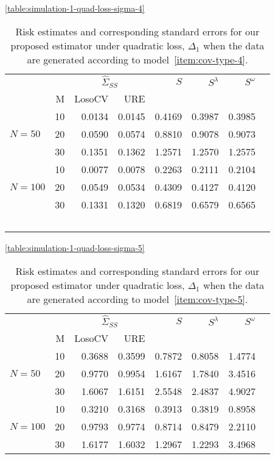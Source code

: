 \documentclass[12pt]{article}
\theoremstyle{definition}
\begin{document}

\begin{table}[H]\ref{table:simulation-1-quad-loss-sigma-4}
\centering
\caption{Risk estimates and corresponding standard errors for our proposed estimator under quadratic loss, $\Delta_1$ when the data are generated according to model~\ref{item:cov-type-4}.} 
\begin{tabular}{l|r|rrrrrr}
&  & \multicolumn{2}{c}{$\hat{\Sigma}_{SS}$} & $S$ & $S^\lambda$ & $S^\omega$ \\ 
&M & \mbox{LosoCV} & \mbox{URE} &  \\ 
  \hline
 &    10 & 0.0134 &  0.0145	& 0.4169 & 0.3987 & 0.3985 \\ 
$N = 50$ &    20 & 0.0590 & 0.0574 & 0.8810& 0.9078 & 0.9073 \\ 
 &    30 & 0.1351 &  0.1362	& 1.2571  & 1.2570 & 1.2575\\ \hdashline
     &    10 & 0.0077 &  0.0078 & 0.2263  & 0.2111 & 0.2104 \\ 
  $N = 100$ &    20 & 0.0549 & 0.0534  & 0.4309 & 0.4127 & 0.4120 \\ 
   &    30 & 0.1331 & 0.1320 & 0.6819  & 0.6579 & 0.6565 \\\
\end{tabular}
\end{table}



\begin{table}[H]\ref{table:simulation-1-quad-loss-sigma-5}
\centering
\caption{Risk estimates and corresponding standard errors for our proposed estimator under quadratic loss, $\Delta_1$ when the data are generated according to model~\ref{item:cov-type-5}.} 
\begin{tabular}{l|r|rrrrrr}
&  & \multicolumn{2}{c}{$\hat{\Sigma}_{SS}$} & $S$ & $S^\lambda$ & $S^\omega$ \\ 
&M & \mbox{LosoCV} & \mbox{URE} &  \\ 
  \hline
 &    10 & 0.3688 & 0.3599	& 0.7872& 0.8058 & 1.4774 \\ 
$N = 50$ &    20 & 0.9770 &   0.9954	 & 1.6167& 1.7840 & 3.4516 \\ 
  &    30 & 1.6067 &	1.6151   &  2.5548 & 2.4837 & 4.9027 \\ \hdashline
  &    10 & 0.3210 & 0.3168 & 0.3913 & 0.3819 & 0.8958\\ 
  $N = 100$ &    20 & 0.9793 & 0.9774 &  0.8714 & 0.8479 & 2.2110\\ 
   &    30 & 1.6177 &  1.6032  & 1.2967  & 1.2293 & 3.4968\\ 
\end{tabular}
\end{table}
\end{document}
